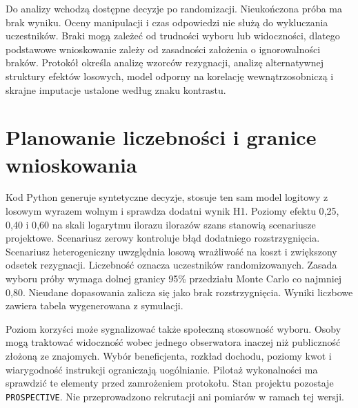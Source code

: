 \documentclass[11pt,a4paper]{article}
\begin{document}
Do analizy wchodzą dostępne decyzje po randomizacji. Nieukończona próba ma brak wyniku. Oceny manipulacji i czas odpowiedzi nie służą do wykluczania uczestników. Braki mogą zależeć od trudności wyboru lub widoczności, dlatego podstawowe wnioskowanie zależy od zasadności założenia o ignorowalności braków. Protokół określa analizę wzorców rezygnacji, analizę alternatywnej struktury efektów losowych, model odporny na korelację wewnątrzosobniczą i skrajne imputacje ustalone według znaku kontrastu.

\section{Planowanie liczebności i granice wnioskowania}
Kod Python generuje syntetyczne decyzje, stosuje ten sam model logitowy z losowym wyrazem wolnym i sprawdza dodatni wynik H1. Poziomy efektu 0{,}25, 0{,}40 i 0{,}60 na skali logarytmu ilorazu ilorazów szans stanowią scenariusze projektowe. Scenariusz zerowy kontroluje błąd dodatniego rozstrzygnięcia. Scenariusz heterogeniczny uwzględnia losową wrażliwość na koszt i zwiększony odsetek rezygnacji. Liczebność oznacza uczestników randomizowanych. Zasada wyboru próby wymaga dolnej granicy 95\% przedziału Monte Carlo co najmniej 0{,}80. Nieudane dopasowania zalicza się jako brak rozstrzygnięcia. Wyniki liczbowe zawiera tabela wygenerowana z symulacji.


Poziom korzyści może sygnalizować także społeczną stosowność wyboru. Osoby mogą traktować widoczność wobec jednego obserwatora inaczej niż publiczność złożoną ze znajomych. Wybór beneficjenta, rozkład dochodu, poziomy kwot i wiarygodność instrukcji ograniczają uogólnianie. Pilotaż wykonalności ma sprawdzić te elementy przed zamrożeniem protokołu. Stan projektu pozostaje \texttt{PROSPECTIVE}. Nie przeprowadzono rekrutacji ani pomiarów w ramach tej wersji.


\end{document}
